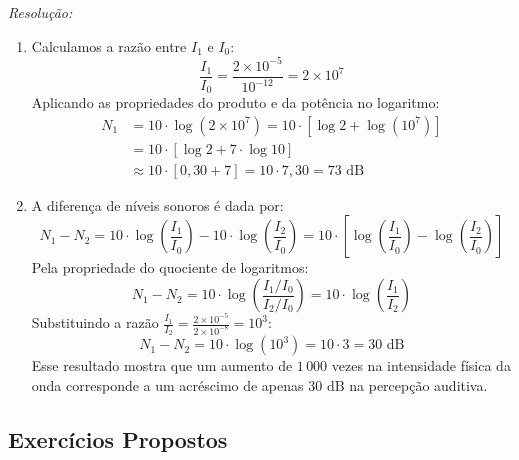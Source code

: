 \documentclass[12pt,a4paper]{report}
\begin{document}
	\textit{Resolução:}
	\begin{enumerate}[label=\textbf{\alph*)}]
		\item Calculamos a razão entre $I_1$ e $I_0$:
		$$\frac{I_1}{I_0} = \frac{2 \times 10^{-5}}{10^{-12}} = 2 \times 10^7$$
		Aplicando as propriedades do produto e da potência no logaritmo:
		\begin{align*}
			N_1 &= 10 \cdot \log(2 \times 10^7) = 10 \cdot [\log 2 + \log(10^7)] \\
			&= 10 \cdot [\log 2 + 7 \cdot \log 10] \\
			&\approx 10 \cdot [0{,}30 + 7] = 10 \cdot 7{,}30 = 73\text{ dB}
		\end{align*}
		
		\item A diferença de níveis sonoros é dada por:
		$$N_1 - N_2 = 10 \cdot \log\left(\frac{I_1}{I_0}\right) - 10 \cdot \log\left(\frac{I_2}{I_0}\right) = 10 \cdot \left[ \log\left(\frac{I_1}{I_0}\right) - \log\left(\frac{I_2}{I_0}\right) \right]$$
		Pela propriedade do quociente de logaritmos:
		$$N_1 - N_2 = 10 \cdot \log\left( \frac{I_1 / I_0}{I_2 / I_0} \right) = 10 \cdot \log\left(\frac{I_1}{I_2}\right)$$
		Substituindo a razão $\frac{I_1}{I_2} = \frac{2 \times 10^{-5}}{2 \times 10^{-8}} = 10^3$:
		$$N_1 - N_2 = 10 \cdot \log(10^3) = 10 \cdot 3 = 30\text{ dB}$$
		Esse resultado mostra que um aumento de $1\,000$ vezes na intensidade física da onda corresponde a um acréscimo de apenas $30\text{ dB}$ na percepção auditiva.
	\end{enumerate}
	

	\subsection{Exercícios Propostos}
	
\end{document}

